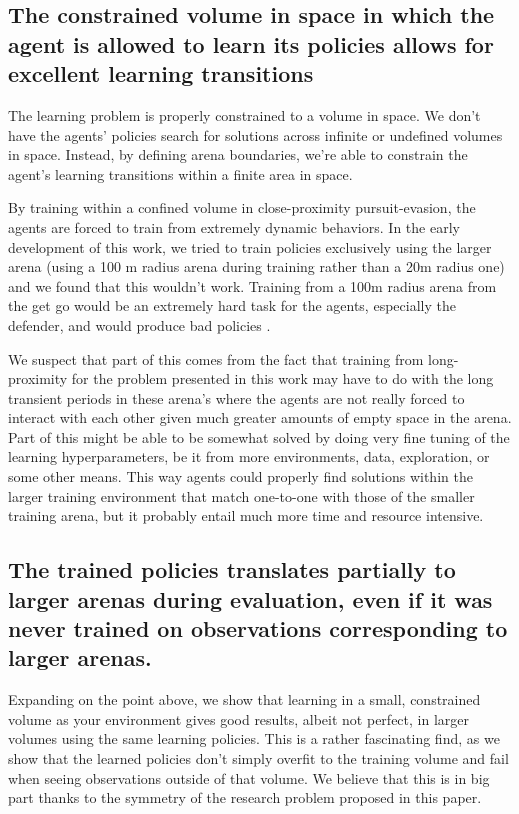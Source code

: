 \subsection*{The constrained volume in space in which the agent is allowed to learn its policies allows for excellent learning transitions}


The learning problem is properly constrained to a volume in space. We don't have the agents' policies search for solutions across infinite or undefined volumes in space. Instead, by defining arena boundaries, we're able to constrain the agent's learning transitions within a finite area in space.

By training within a confined volume in close-proximity pursuit-evasion, the agents are forced to train from extremely dynamic behaviors. In the early development of this work, we tried to train policies exclusively using the larger arena (using a 100 m radius arena during training rather than a 20m radius one) and we found that this wouldn't work. Training from a 100m radius arena from the get go would be an extremely hard task for the agents, especially the defender, and would produce bad policies .

We suspect that part of this comes from the fact that training from long-proximity for the problem presented in this work may have to do with the long transient periods in these arena's where the agents are not really forced to interact with each other given much greater amounts of empty space in the arena. Part of this might be able to be somewhat solved by doing very fine tuning of the learning hyperparameters, be it from more environments, data, exploration, or some other means. This way agents could properly find solutions within the larger training environment that match one-to-one with those of the smaller training arena, but it probably entail much more time and resource intensive.



\subsection*{The trained policies  translates partially to larger arenas during evaluation, even if it was never trained on observations corresponding to larger arenas.}


Expanding on the point above, we show that learning in a small, constrained volume as your environment gives good results, albeit not perfect, in larger volumes using the same learning policies. This is a rather fascinating find, as we show that the learned policies don't simply overfit to the training volume and fail when seeing observations outside of that volume. We believe that this is in big part thanks to the symmetry of the research problem proposed in this paper.

